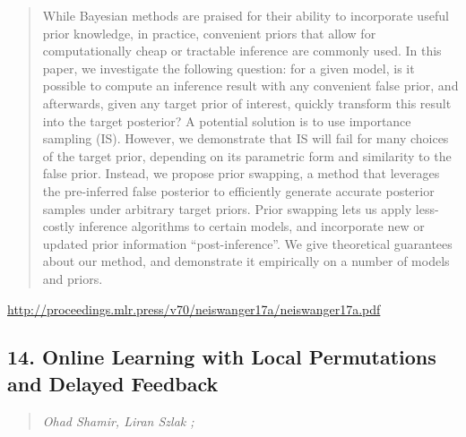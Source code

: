 \documentclass{article}
\begin{document}
\begin{quote}
    While Bayesian methods are praised for their ability to incorporate useful prior knowledge, in practice, convenient priors that allow for computationally cheap or tractable inference are commonly used. In this paper, we investigate the following question: for a given model, is it possible to compute an inference result with any convenient false prior, and afterwards, given any target prior of interest, quickly transform this result into the target posterior? A potential solution is to use importance sampling (IS). However, we demonstrate that IS will fail for many choices of the target prior, depending on its parametric form and similarity to the false prior. Instead, we propose prior swapping, a method that leverages the pre-inferred false posterior to efficiently generate accurate posterior samples under arbitrary target priors. Prior swapping lets us apply less-costly inference algorithms to certain models, and incorporate new or updated prior information “post-inference”. We give theoretical guarantees about our method, and demonstrate it empirically on a number of models and priors.  
\end{quote}

\href{http://proceedings.mlr.press/v70/neiswanger17a/neiswanger17a.pdf}{http://proceedings.mlr.press/v70/neiswanger17a/neiswanger17a.pdf}

\subsection{14. Online Learning with Local Permutations and Delayed Feedback}

\begin{quote}
\footnotesize{\textit{Ohad Shamir, Liran Szlak ;}}

\end{quote}
\end{document}
